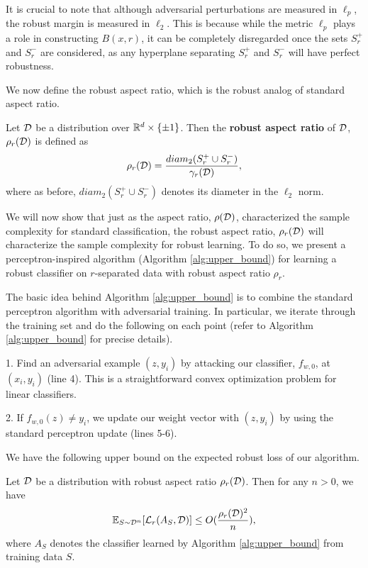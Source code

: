 It is crucial to note that although adversarial perturbations are measured in $\ell_p$, the robust margin is measured in $\ell_2$. This is because while the metric $\ell_p$ plays a role in constructing $B(x,r)$, it can be completely disregarded once the sets $S_r^+$ and $S_r^-$ are considered, as any hyperplane separating $S_r^+$ and $S_r^-$ will have perfect robustness.  

We now define the robust aspect ratio, which is the robust analog of standard aspect ratio.

\begin{defn}
Let ${\mathcal D}$ be a distribution over $\mathbb R^d \times \{\pm 1\}$. Then the \textbf{robust aspect ratio} of ${\mathcal D}$, $\rho_r({\mathcal D})$ is defined as $$\rho_r({\mathcal D}) = \frac{diam_2(S_r^+ \cup S_r^-)}{\gamma_r({\mathcal D})},$$ where as before, $diam_2(S_r^+ \cup S_r^-)$ denotes its diameter in the $\ell_2$ norm.
\end{defn}

We will now show that just as the aspect ratio, $\rho({\mathcal D})$, characterized the sample complexity for standard classification, the robust aspect ratio, $\rho_r({\mathcal D})$ will characterize the sample complexity for robust learning. To do so, we present a perceptron-inspired algorithm (Algorithm \ref{alg:upper_bound}) for learning a robust classifier on $r$-separated data with robust aspect ratio $\rho_r$. 

The basic idea behind Algorithm \ref{alg:upper_bound} is to combine the standard perceptron algorithm with adversarial training. In particular, we iterate through the training set and do the following on each point (refer to Algorithm \ref{alg:upper_bound} for precise details). 

1. Find an adversarial example $(z, y_i)$ by attacking our classifier, $f_{w, 0}$, at $(x_i, y_i)$ (line 4). This is a straightforward convex optimization problem for linear classifiers.

2. If $f_{w,0}(z) \neq y_i$, we update our weight vector with $(z, y_i)$ by using the standard perceptron update (lines 5-6).

We have the following upper bound on the expected robust loss of our algorithm.

\begin{thm}\label{thm:upper_bound}
Let ${\mathcal D}$ be a distribution with robust aspect ratio $\rho_r({\mathcal D})$. Then for any $n > 0$, we have $${\mathbb E}_{S \sim {\mathcal D}^n} [\mathcal L_r(A_S, {\mathcal D})] \leq O(\frac{\rho_r({\mathcal D})^2}{n}),$$ where $A_S$ denotes the classifier learned by Algorithm \ref{alg:upper_bound} from training data $S$. 
\end{thm}

